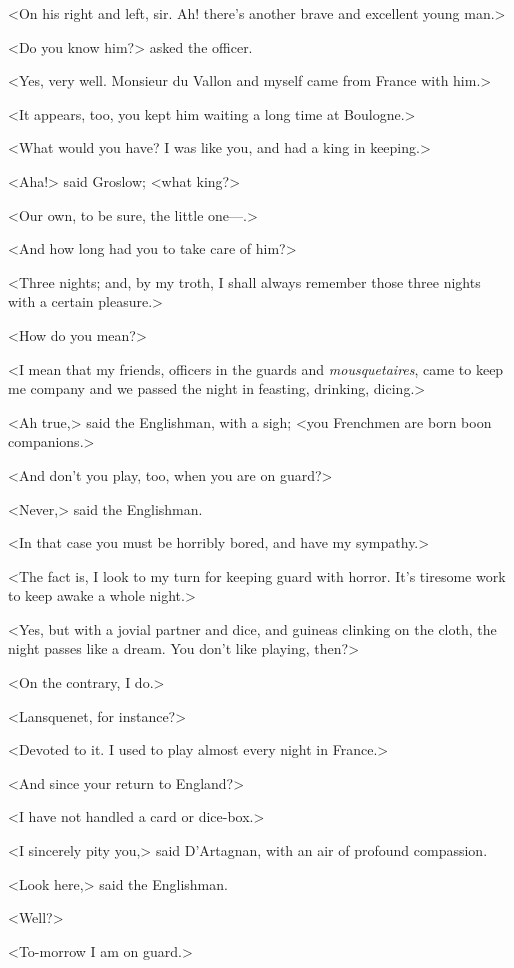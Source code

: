 <On his right and left, sir. Ah! there's another brave and excellent young man.>

<Do you know him?> asked the officer.

<Yes, very well. Monsieur du Vallon and myself came from France with him.>

<It appears, too, you kept him waiting a long time at Boulogne.>

<What would you have? I was like you, and had a king in keeping.>

<Aha!> said Groslow; <what king?>

<Our own, to be sure, the little one—.>

<And how long had you to take care of him?>

<Three nights; and, by my troth, I shall always remember those three nights with a certain pleasure.>

<How do you mean?>

<I mean that my friends, officers in the guards and \emph{mousquetaires}, came to keep me company and we passed the night in feasting, drinking, dicing.>

<Ah true,> said the Englishman, with a sigh; <you Frenchmen are born boon companions.>

<And don't you play, too, when you are on guard?>

<Never,> said the Englishman.

<In that case you must be horribly bored, and have my sympathy.>

<The fact is, I look to my turn for keeping guard with horror. It's tiresome work to keep awake a whole night.>

<Yes, but with a jovial partner and dice, and guineas clinking on the cloth, the night passes like a dream. You don't like playing, then?>

<On the contrary, I do.>

<Lansquenet, for instance?>

<Devoted to it. I used to play almost every night in France.>

<And since your return to England?>

<I have not handled a card or dice-box.>

<I sincerely pity you,> said D'Artagnan, with an air of profound compassion.

<Look here,> said the Englishman.

<Well?>

<To-morrow I am on guard.>

